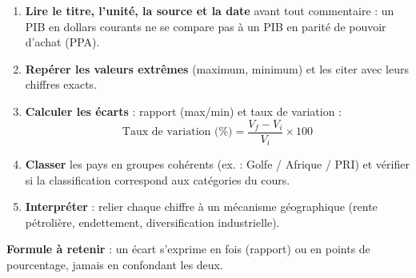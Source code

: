 \documentclass[11pt]{article}
\begin{document}
\begin{methode}
\begin{enumerate}
\item \textbf{Lire le titre, l'unité, la source et la date} avant tout commentaire : un PIB en dollars courants ne se compare pas à un PIB en parité de pouvoir d'achat (PPA).
\item \textbf{Repérer les valeurs extrêmes} (maximum, minimum) et les citer avec leurs chiffres exacts.
\item \textbf{Calculer les écarts} : rapport (max/min) et taux de variation :
\[ \text{Taux de variation (\%)} = \frac{V_f - V_i}{V_i} \times 100 \]
\item \textbf{Classer} les pays en groupes cohérents (ex. : Golfe / Afrique / PRI) et vérifier si la classification correspond aux catégories du cours.
\item \textbf{Interpréter} : relier chaque chiffre à un mécanisme géographique (rente pétrolière, endettement, diversification industrielle).
\end{enumerate}
\textbf{Formule à retenir} : un écart s'exprime en fois (rapport) ou en points de pourcentage, jamais en confondant les deux.
\end{methode}
\end{document}
